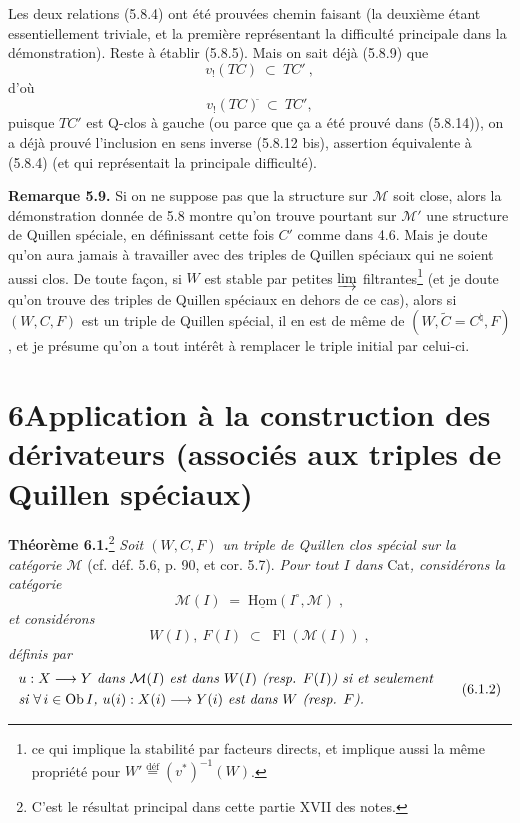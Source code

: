 \documentclass[11pt]{article}
\newcommand{\printedpage}[1]{\marginpar{\footnotesize p.~#1}}
\newcommand{\msp}[1]{\marginpar{\footnotesize [#1]}}
\newcommand{\Fl}{\operatorname{Fl}}
\newcommand{\Ob}{\operatorname{Ob}}
\newcommand{\defeq}{\overset{\text{déf}}{=}}
\newcommand{\cl}{^{\tilde{}}}%
\begin{document}
Les deux relations (5.8.4) ont été prouvées chemin faisant (la deuxième étant essentiellement triviale, et la première représentant la difficulté principale dans la démonstration). Reste à établir (5.8.5). Mais on sait déjà (5.8.9) que
\[
v_!(TC) \ \subset \ TC'\ ,
\]
\msp{page 97}
d'où
\[
v_!(TC)\cl \ \subset \ TC',
\]
puisque $TC'$ est Q-clos à gauche (ou parce que ça a été prouvé dans (5.8.14)), on a déjà prouvé l'inclusion en sens inverse (5.8.12 bis), assertion équivalente à (5.8.4) (et qui représentait la principale difficulté).

\textbf{Remarque 5.9.} Si on ne suppose pas que la structure sur $\mathcal{M}$ soit close, alors la démonstration donnée de 5.8 montre qu'on trouve pourtant sur $\mathcal{M}'$ une structure de Quillen spéciale, en définissant cette fois $C'$ comme dans 4.6. Mais je doute qu'on aura jamais à travailler avec des triples de Quillen spéciaux qui ne soient aussi clos. De toute façon, si $W$ est stable par petites $\varinjlim$ filtrantes\footnote[28]{ce qui implique la stabilité par facteurs directs, et implique aussi la même propriété pour $W' \defeq (v^*)^{-1}(W)$.} (et je doute qu'on trouve des triples de Quillen spéciaux en dehors de ce cas), alors si $(W, C, F)$ est un triple de Quillen spécial, il en est de même de $(W, \tilde{C} = C^\natural, F)$, et je présume qu'on a tout intérêt à remplacer le triple initial par celui-ci. %

\printedpage{49}

\msp{page 98}

\section*{6\quad Application à la construction des dérivateurs (associés aux triples de Quillen spéciaux)}

\textbf{Théorème 6.1.}\footnote[29]{C'est le résultat principal dans cette partie XVII des notes.} \textit{Soit $(W,C,F)$ un triple de Quillen clos spécial sur la catégorie $\mathcal{M}$} (cf. déf. 5.6, p. 90, et cor. 5.7). \textit{Pour tout $I$ dans} Cat\textit{, considérons la catégorie}
\[
\mathcal{M}(I) \;=\; \underline{\mathrm{Hom}}(I^{\circ},\mathcal{M}) \;, \tag*{(6.1.1)}
\]
\textit{et considérons}
\[
W(I),\ F(I) \;\subset\; \Fl(\mathcal{M}(I)) \;,
\]
\textit{définis par}
\[
\begin{aligned}
&\text{\textit{$u : X \longrightarrow Y$ dans $\mathcal{M}(I)$ est dans $W(I)$ (resp. $F(I)$) si et seulement}}\\
&\text{\textit{si $\forall\, i \in \Ob I$, $u(i) : X(i) \longrightarrow Y(i)$ est dans $W$ (resp. $F$).}}
\end{aligned}
\tag*{(6.1.2)}
\]
\end{document}
